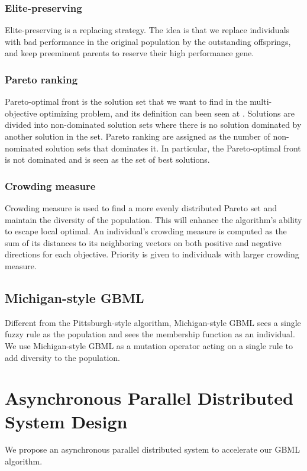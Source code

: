 \documentclass[conference]{IEEEtran}
\begin{document}
	 \subsubsection{Elite-preserving}
	 
	 Elite-preserving is a replacing strategy. The idea is that we replace individuals with bad performance in the original population by the outstanding offsprings, and keep preeminent parents to reserve their high performance gene. 
	 
	 \subsubsection{Pareto ranking}
	 
   Pareto-optimal front is the solution set that we want to find in the multi-objective optimizing problem, and its definition can been seen at \cite{ishibuchi2007analysis}. Solutions are divided into  non-dominated solution sets where there is no solution dominated by another solution in the set. Pareto ranking are assigned as the number of non-nominated solution sets that dominates it. In particular, the Pareto-optimal front is not dominated and is seen as the set of best solutions.
	 
	 \subsubsection{Crowding measure}
	 
	 Crowding measure is used to find a more evenly distributed Pareto set and maintain the diversity of the population. This will enhance the algorithm's ability to escape local optimal. An individual's crowding measure is computed as the sum of its distances to its neighboring vectors on both positive and negative directions for each objective. Priority is given to individuals with larger crowding measure.
	 
	 \subsection{Michigan-style GBML}
	 
   Different from the Pittsburgh-style algorithm, Michigan-style GBML sees a single fuzzy rule as the population and sees the membership function as an individual. We use Michigan-style GBML as a mutation operator acting on a single rule to add diversity to the population. 
   
  
   
  \section{Asynchronous Parallel Distributed System Design}
  We propose an asynchronous parallel distributed system to accelerate our GBML algorithm. 
\end{document}
